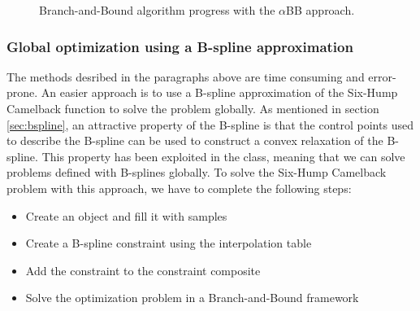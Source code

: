 \begin{figure}[H]
\centering
{}
\caption{Branch-and-Bound algorithm progress with the $\alpha$BB approach.}
\label{fig:shcb_progress}
\end{figure}

\subsubsection{Global optimization using a B-spline approximation}
\label{sec:shcb_bspline}
The methods desribed in the paragraphs above are time consuming and error-prone. An easier approach is to use a B-spline approximation of the Six-Hump Camelback function to solve the problem globally. As mentioned in section \ref{sec:bspline}, an attractive property of the B-spline is that the control points used to describe the B-spline can be used to construct a convex relaxation of the B-spline. This property has been exploited in the  class, meaning that we can solve problems defined with B-splines globally. To solve the Six-Hump Camelback problem with this approach, we have to complete the following steps:
\begin{itemize}
\item
Create an  object and fill it with samples
\item
Create a B-spline constraint using the interpolation table
\item
Add the constraint to the constraint composite
\item
Solve the optimization problem in a Branch-and-Bound framework
\end{itemize}

